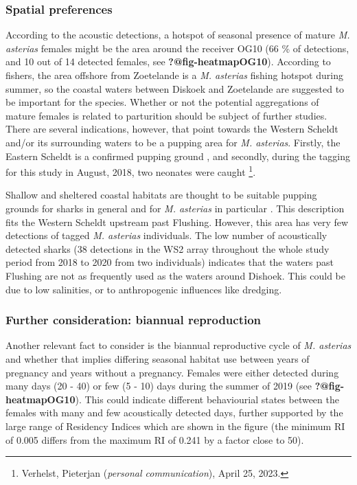 \documentclass[
  authoryear,
  review,
  3p]{elsarticle}
\begin{document}
\hypertarget{spatial-preferences}{%
\subsubsection{Spatial preferences}\label{spatial-preferences}}

According to the acoustic detections, a hotspot of seasonal presence of
mature \emph{M. asterias} females might be the area around the receiver
OG10 (66 \% of detections, and 10 out of 14 detected females, see
\textbf{?@fig-heatmapOG10}). According to fishers, the area offshore
from Zoetelande is a \emph{M. asterias} fishing hotspot during summer,
so the coastal waters between Diskoek and Zoetelande are suggested to be
important for the species. Whether or not the potential aggregations of
mature females is related to parturition should be subject of further
studies. There are several indications, however, that point towards the
Western Scheldt and/or its surrounding waters to be a pupping area for
\emph{M. asterias}. Firstly, the Eastern Scheldt is a confirmed pupping
ground \citep{breve_2016}, and secondly, during the tagging for this
study in August, 2018, two neonates \citep[around 30 cm
TL,][]{farrell_2010} were caught \footnote{Verhelst, Pieterjan
  (\emph{personal communication}), April 25, 2023.}.

Shallow and sheltered coastal habitats are thought to be suitable
pupping grounds for sharks in general \citep{speed_2010} and for
\emph{M. asterias} in particular \citep{ellis_2004, ellis_2005}. This
description fits the Western Scheldt upstream past Flushing. However,
this area has very few detections of tagged \emph{M. asterias}
individuals. The low number of acoustically detected sharks (38
detections in the WS2 array throughout the whole study period from 2018
to 2020 from two individuals) indicates that the waters past Flushing
are not as frequently used as the waters around Dishoek. This could be
due to low salinities, or to anthropogenic influences like dredging.

\hypertarget{further-consideration-biannual-reproduction}{%
\subsubsection{Further consideration: biannual
reproduction}\label{further-consideration-biannual-reproduction}}

Another relevant fact to consider is the biannual reproductive cycle of
\emph{M. asterias} and whether that implies differing seasonal habitat
use between years of pregnancy and years without a pregnancy. Females
were either detected during many days (20 - 40) or few (5 - 10) days
during the summer of 2019 (see \textbf{?@fig-heatmapOG10}). This could
indicate different behaviourial states between the females with many and
few acoustically detected days, further supported by the large range of
Residency Indices which are shown in the figure (the minimum RI of 0.005
differs from the maximum RI of 0.241 by a factor close to 50).
\end{document}
